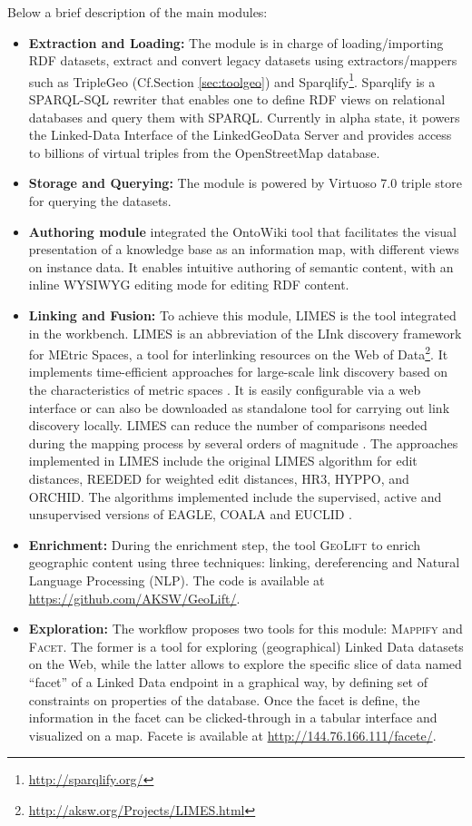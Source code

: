 Below a brief description of the main modules:
\begin{itemize}
\item \textbf{Extraction and Loading:} The module is in charge of loading/importing RDF datasets, extract and convert legacy datasets using extractors/mappers such as TripleGeo (Cf.Section \ref{sec:toolgeo}) and Sparqlify\footnote{\url{http://sparqlify.org/}}. Sparqlify is a SPARQL-SQL rewriter that enables one to define RDF views on relational databases and query them with SPARQL. Currently in alpha state, it powers the Linked-Data Interface of the LinkedGeoData Server and provides access to billions of virtual triples from the OpenStreetMap database.
\item \textbf{Storage and Querying:} The module is powered by Virtuoso 7.0 triple store for querying the datasets.
\item \textbf{Authoring module} integrated the OntoWiki tool \cite{ontowiki14} that facilitates the visual presentation of a knowledge base as an information map, with different views on instance data. It enables intuitive authoring of semantic content, with an inline WYSIWYG editing mode for editing RDF content. 

\item \textbf{Linking and Fusion:} To achieve this module, LIMES is the tool integrated in the workbench. LIMES is an abbreviation of the LInk discovery framework for MEtric Spaces, a tool for interlinking resources on the Web of Data\footnote{\url{http://aksw.org/Projects/LIMES.html}}. It implements time-efficient approaches for large-scale link discovery based on the characteristics of metric spaces \cite{ngau11}. It is easily configurable via a web interface or can also be downloaded as standalone tool for carrying out link discovery locally. LIMES can reduce the number of comparisons needed during the mapping process by several orders of magnitude \cite{song13}. The approaches implemented in LIMES include the original LIMES algorithm for edit distances, REEDED for weighted edit distances, HR3, HYPPO, and ORCHID. The algorithms implemented  include the supervised, active and unsupervised versions of EAGLE, COALA and EUCLID \cite{ngon13}. 

\item \textbf{Enrichment:} During the enrichment step, the tool \textsc{GeoLift} \cite{geolift14} to enrich geographic content using three techniques: linking, dereferencing and Natural Language Processing (NLP). The code is available at \url{https://github.com/AKSW/GeoLift/}.

\item \textbf{Exploration:} The workflow proposes two tools for this module: \textsc{Mappify} and \textsc{Facet}. The former is a tool for exploring (geographical) Linked Data datasets on the Web, while the latter allows  to explore the specific slice of data named ``facet''  of a Linked Data endpoint in a graphical way, by defining set of constraints on properties of the database. Once the facet is define, the information in the facet can be clicked-through in a tabular interface and visualized on a map. Facete is available at \url{http://144.76.166.111/facete/}.
\end{itemize} 



